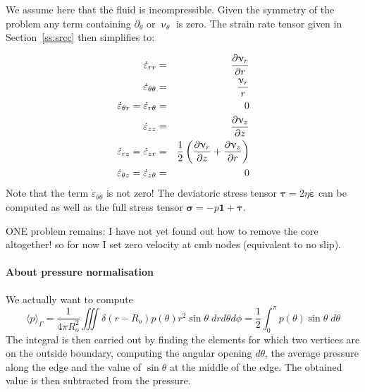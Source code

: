 We assume here that the fluid is incompressible.
Given the symmetry of the problem any term containing $\partial_\theta$ or $\upnu_\theta$ is zero.
The strain rate tensor given in Section~\ref{ss:srcc} then simplifies to:

\begin{eqnarray}
\dot\varepsilon_{rr} 
&=& \frac{\partial \upnu_r}{\partial r} \nonumber\\
\dot\varepsilon_{\theta\theta}  &=& \frac{\upnu_r}{r} \nonumber\\
\dot\varepsilon_{\theta r} = \dot\varepsilon_{r\theta}  &=& 0 \nonumber\\
\dot\varepsilon_{zz} &=& \frac{\partial \upnu_z}{\partial z} \nonumber\\
\dot{\varepsilon}_{rz} = \dot{\varepsilon}_{zr} 
&=& \frac{1}{2}\left( \frac{\partial \upnu_r}{\partial z} + \frac{\partial \upnu_z}{\partial r} \right) \nonumber\\
\dot{\varepsilon}_{\theta z} = \dot{\varepsilon}_{z \theta} &=& 0 \nonumber
\end{eqnarray}
Note that the term $\dot\varepsilon_{\theta\theta} $ is not zero!
The deviatoric stress tensor ${\bm \tau}=2\eta \dot{\bm \varepsilon}$ can be computed
as well as the full stress tensor ${\bm \sigma}=-p {\bm 1} + {\bm \tau}$. 


ONE problem remains: I have not yet found out how to remove the core altogether!
so for now I set zero velocity at cmb nodes (equivalent to no slip).

\paragraph{About pressure normalisation}

We actually want to compute 
\[
\langle p \rangle _\Gamma = \frac{1}{4\pi R_o^2} \iiint \delta(r-R_o) p(\theta) r^2 \sin\theta \; dr d\theta d\phi 
= \frac{1}{2} \int_0^\pi p(\theta) \sin\theta \; d\theta
\]
The integral is then carried out by finding the elements for which two vertices are on the outside boundary, 
computing the angular opening $d\theta$, the average pressure along the edge and the value of $\sin\theta$ at the
middle of the edge. 
The obtained value is then subtracted from the pressure. 


